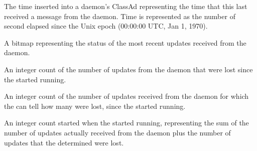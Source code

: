 \begin{description}

\item[\AdAttr{LastHeardFrom}:] The time inserted into a daemon's
  ClassAd representing the time that this 
  last received a message from the daemon.
  Time is  represented as the number of second elapsed since
  the Unix epoch (00:00:00 UTC, Jan 1, 1970).

\item[\AdAttr{UpdatesHistory}:] A bitmap representing the status of
  the most recent updates received from the daemon.

\item[\AdAttr{UpdatesLost}:] An integer count of the number of updates
  from the daemon that were lost since the  started
  running.

\item[\AdAttr{UpdatesSequenced}:] An integer count of the number of updates
  received from the daemon for which the  can tell
  how many were lost, since the  started running.

\item[\AdAttr{UpdatesTotal}:] An integer count started when the
   started running, representing the sum
  of the number of updates actually received from the daemon plus
  the number of updates that the  determined were lost.

\end{description}

